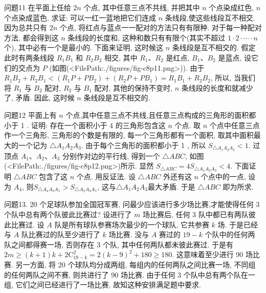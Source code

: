问题11 在平面上任给 $2 n$ 个点, 其中任意三点不共线, 并把其中 $n$ 个点染成红色, $n$ 个点染成蓝色.
求证: 可以一红一蓝地把它们连成 $n$ 条线段,使这些线段互不相交.
因为总共只有 $2 n$ 个点, 将红点与蓝点一一配对的方法只有有限种.
对于每一种配对方法, 都会得到这 $n$ 条线段的长度和, 这种和数只有有限个(其实不超过 $1 \cdot 2 \cdot \cdots \cdot n$ 个), 其中必有一个是最小的.
下面来证明, 这时候这 $n$ 条线段是互不相交的.
假定此时有两条线段 $R_1 B_1$ 和 $R_2 B_2$ 相交, 其中 $R_1 、 R_2$ 是红点, $B_1 、 B_2$ 是蓝点, 设它们的交点为 $P$ (如图(<FilePath:./figures/fig-c8p11.png>)). 由于 $R_1 B_2+R_2 B_1<\left(R_1 P+P B_2\right)+\left(R_2 P+P B_1\right)= R_1 B_1+R_2 B_2$, 所以, 当我们将 $R_1$ 与 $B_2$ 配对, $R_2$ 与 $B_1$ 配对, 其他的保持不变时, $n$ 条线段的长度和就减少了, 矛盾.
因此, 这时候 $n$ 条线段是互不相交的.



问题12 平面上有 $n$ 个点,其中任意三点不共线,且任意三点构成的三角形的面积都小于 1 . 证明: 存在一个面积小于 4 的三角形包含这 $n$ 个点.
取 $n$ 个点中任意三点作一个三角形, 三角形的个数是有限的, 每一个三角形都有一个面积, 取其中面积最大的一个记为 $\triangle A_1 A_2 A_3$. 由于每个三角形的面积都小于 1 , 所以 $S_{\triangle A_1 A_2 A_3}<1$. 过顶点 $A_1 、 A_2 、 A_3$ 分别作对边的平行线, 得到一个 $\triangle A B C$, 如图(<FilePath:./figures/fig-c8p12.png>)所示.
显然 $S_{\triangle A B C}=4 S_{\triangle A_1 A_2 A_3}<4$.
下面证明 $\triangle A B C$ 包含了这 $n$ 个点.
用反证法.
设 $\triangle A B C$ 外还有这 $n$ 个点中的一点, 设为 $A_4$, 则$S_{\triangle A_4 A_3 A_1}>S_{\triangle A_2 A_3 A_1}$, 这与$\triangle A_1 A_2 A_3$最大矛盾.
于是 $\triangle A B C$ 即为所求.



问题13. 20 个足球队参加全国冠军赛, 问最少应该进行多少场比赛,才能使得任何 3 个队中总有两个队彼此比赛过?
设进行了 $m$ 场比赛后, 任何 3 队中都已有两队彼此比赛过.
设 $A$ 队是所有球队参赛场次最少的一个球队, 它共参赛 $k$ 场.
于是已经与 $A$ 队比赛过的队至少进行了 $k$ 场比赛.
没与 $A$ 赛过的 $19-k$ 个队中的任何两队之间都得赛一场, 否则存在 3 个队, 其中任何两队都未彼此赛过.
于是有 $2 m \geqslant(k+ 1) k+2 \mathrm{C}_{19-k}^2=2(k-9)^2+180 \geqslant 180$. 这意味着至少进行 90 场比赛.
另一方面, 将 20 个球队均分成两组, 每组内的任何两队之间比赛一场, 不同组的任何两队之间不赛, 则共进行了 90 场比赛.
由于任何 3 个队中总有两个队在一组, 它们之间已经进行了一场比赛, 故知这种安排满足题中要求.



